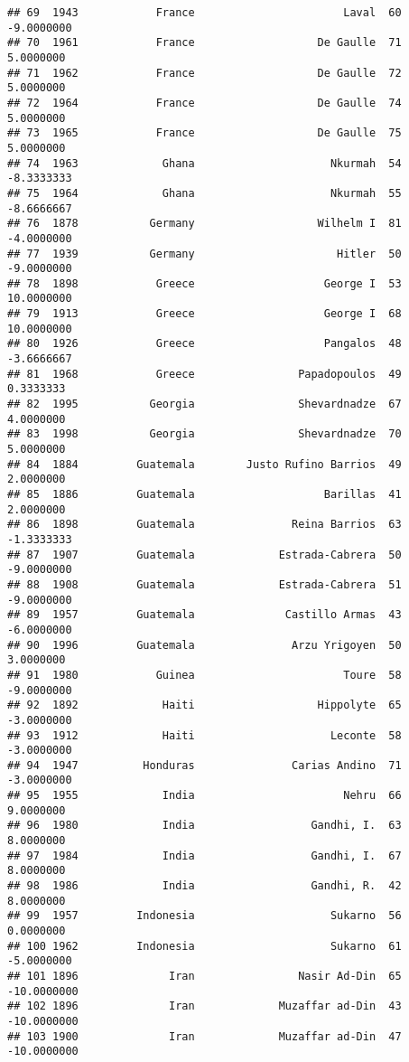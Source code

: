 \documentclass[
]{article}
\begin{document}
\begin{verbatim}
## 69  1943            France                       Laval  60   -9.0000000
## 70  1961            France                   De Gaulle  71    5.0000000
## 71  1962            France                   De Gaulle  72    5.0000000
## 72  1964            France                   De Gaulle  74    5.0000000
## 73  1965            France                   De Gaulle  75    5.0000000
## 74  1963             Ghana                     Nkurmah  54   -8.3333333
## 75  1964             Ghana                     Nkurmah  55   -8.6666667
## 76  1878           Germany                   Wilhelm I  81   -4.0000000
## 77  1939           Germany                      Hitler  50   -9.0000000
## 78  1898            Greece                    George I  53   10.0000000
## 79  1913            Greece                    George I  68   10.0000000
## 80  1926            Greece                    Pangalos  48   -3.6666667
## 81  1968            Greece                Papadopoulos  49    0.3333333
## 82  1995           Georgia                Shevardnadze  67    4.0000000
## 83  1998           Georgia                Shevardnadze  70    5.0000000
## 84  1884         Guatemala        Justo Rufino Barrios  49    2.0000000
## 85  1886         Guatemala                    Barillas  41    2.0000000
## 86  1898         Guatemala               Reina Barrios  63   -1.3333333
## 87  1907         Guatemala             Estrada-Cabrera  50   -9.0000000
## 88  1908         Guatemala             Estrada-Cabrera  51   -9.0000000
## 89  1957         Guatemala              Castillo Armas  43   -6.0000000
## 90  1996         Guatemala               Arzu Yrigoyen  50    3.0000000
## 91  1980            Guinea                       Toure  58   -9.0000000
## 92  1892             Haiti                   Hippolyte  65   -3.0000000
## 93  1912             Haiti                     Leconte  58   -3.0000000
## 94  1947          Honduras               Carias Andino  71   -3.0000000
## 95  1955             India                       Nehru  66    9.0000000
## 96  1980             India                  Gandhi, I.  63    8.0000000
## 97  1984             India                  Gandhi, I.  67    8.0000000
## 98  1986             India                  Gandhi, R.  42    8.0000000
## 99  1957         Indonesia                     Sukarno  56    0.0000000
## 100 1962         Indonesia                     Sukarno  61   -5.0000000
## 101 1896              Iran                Nasir Ad-Din  65  -10.0000000
## 102 1896              Iran             Muzaffar ad-Din  43  -10.0000000
## 103 1900              Iran             Muzaffar ad-Din  47  -10.0000000

\end{verbatim}
\end{document}
